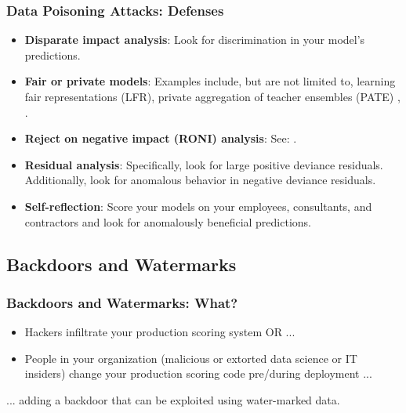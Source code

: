 \documentclass[11pt,
               aspectratio=169,
               hyperref={colorlinks}
               ]{beamer}
\begin{document}
			\begin{frame}[label={slide:data_poisoning_defense}]
		
				\frametitle{Data Poisoning Attacks: \textbf{Defenses}}
				
				\begin{itemize}
					\item \textbf{Disparate impact analysis}: Look for discrimination in your model’s predictions. 
					\item \textbf{Fair or private models}: Examples include, but are not limited to, learning fair representations (LFR), private aggregation of teacher ensembles (PATE) \cite{pate}, \cite{lfr}.
					\item \textbf{Reject on negative impact (RONI) analysis}: See: \textit{} \cite{security_of_ml}. 		
					\item \textbf{Residual analysis}: Specifically, look for large positive deviance residuals. Additionally, look for anomalous behavior in negative deviance residuals.
					\item \textbf{Self-reflection}: Score your models on your employees, consultants, and contractors and look for anomalously beneficial predictions.
				\end{itemize}	
			\end{frame}
		
		\subsection{Backdoors and Watermarks}
			
			\begin{frame}
		
				\frametitle{Backdoors and Watermarks: \textbf{What?}}
				\begin{itemize}
				\item Hackers infiltrate your production scoring system OR ... 
				\item People in your organization (malicious or extorted data science or IT insiders) change your production scoring code pre/during deployment ... 
				\end{itemize}
				\vspace{20pt}
\hspace{10pt} ... adding a backdoor that can be exploited using water-marked data.
			
			\end{frame}
		
\end{document}
